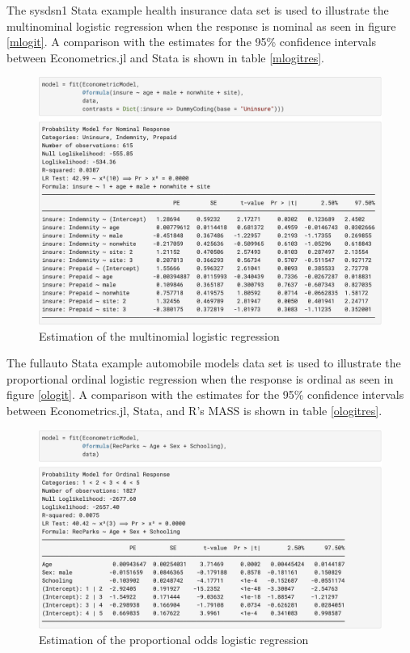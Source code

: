\documentclass{juliacon}
\begin{document}
The sysdsn1 Stata example health insurance data set is used to illustrate the multinominal logistic regression when the response is nominal as seen in figure \vref{mlogit}. A comparison with the estimates for the 95\% confidence intervals between Econometrics.jl and Stata is shown in table \vref{mlogitres}.

\begin{figure}[hbpt]
	\includegraphics[max width=\linewidth,center]{estimator_mlogit}
	\caption{Estimation of the multinomial logistic regression}
	\label{mlogit}
\end{figure}

The fullauto Stata example automobile models data set is used to illustrate the proportional ordinal logistic regression when the response is ordinal as seen in figure \vref{ologit}. A comparison with the estimates for the 95\% confidence intervals between Econometrics.jl, Stata, and R's MASS is shown in table \vref{ologitres}.

\begin{figure}[hbpt]
	\includegraphics[max width=\linewidth,center]{estimator_ologit}
	\caption{Estimation of the proportional odds logistic regression}
	\label{ologit}
\end{figure}
\end{document}
